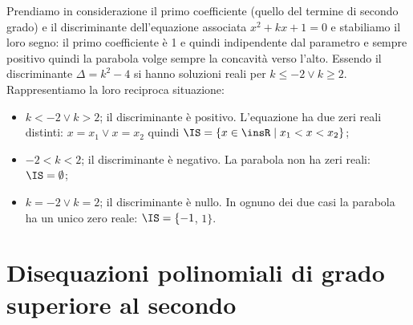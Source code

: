 \begin{exrig}
\begin{esempio}
Prendiamo in considerazione il primo coefficiente (quello del termine di secondo grado) e il discriminante dell'equazione associata $x^2+kx+1=0$ e stabiliamo il loro segno: il primo coefficiente è 1 e quindi indipendente dal parametro e sempre positivo quindi la parabola volge sempre la concavità verso l'alto. Essendo il discriminante $\Delta =k^2-4$ si hanno soluzioni reali per $k\le -2\vee k\ge 2$. Rappresentiamo la loro reciproca situazione:
\begin{center}
 
\end{center}
\begin{itemize}
\item $k<-2\vee k>2$; il discriminante è positivo. L'equazione ha due zeri reali distinti: $x=x_1\vee x=x_2$ quindi $\IS=\{x \in \insR \mid x_1<x<x_2\}$;
\item $-2<k<2$; il discriminante è negativo. La parabola non ha zeri reali: $\IS=\emptyset$;
\item $k=-2\vee k=2$; il discriminante è nullo. In ognuno dei due casi la parabola ha un unico zero reale: $\IS=\{-1$, $1\}$.
\end{itemize}
\end{esempio}
\end{exrig}

\vspazio\ovalbox{\risolvii \ref{ese:4.27}, \ref{ese:4.28}, \ref{ese:4.29}, \ref{ese:4.30}, \ref{ese:4.31}}

\section{Disequazioni polinomiali di grado superiore al secondo}

